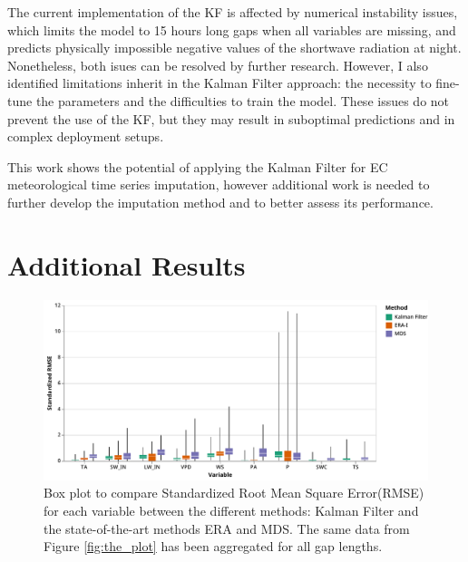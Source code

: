 \documentclass{article}
\newcommand{\imgwidth}{6in}
\let\Oldsection\section
\renewcommand{\section}{\FloatBarrier\Oldsection}
\let\Oldsubsection\subsection
\renewcommand{\subsection}{\FloatBarrier\Oldsubsection}
\begin{document}
The current implementation of the KF is affected by numerical instability issues, which limits the model to  15 hours long gaps when all variables are missing, and predicts physically impossible negative values of the shortwave radiation at night. Nonetheless, both isues can be resolved by further research. However, I also identified limitations inherit in the Kalman Filter approach: the necessity to fine-tune the parameters and the difficulties to train the model. These issues do not prevent the use of the KF, but they may result in suboptimal predictions and in complex deployment setups.

This work shows the potential of applying the Kalman Filter for EC meteorological time series imputation, however additional work is needed to further develop the imputation method and to better assess its performance. 

\printbibliography

\pagebreak

\appendix

\renewcommand\thefigure{\thesection.\arabic{figure}} 
\renewcommand\thetable{\thesection.\arabic{table}} 
\renewcommand\theequation{\thesection.\arabic{equation}} 

\FloatBarrier

\section{Additional Results}

\setcounter{figure}{0} 
\setcounter{table}{0} 


\begin{figure}[H]
    \centerline{\includegraphics[width=\imgwidth]{the_plot_stand}}
\caption{Box plot to compare Standardized Root Mean Square Error(RMSE) for each variable between the different methods: Kalman Filter and the state-of-the-art methods ERA and MDS. The same data from Figure \ref{fig:the_plot} has been aggregated for all gap lengths.}
\label{fig:the_plot_stand}
\end{figure}
\end{document}
